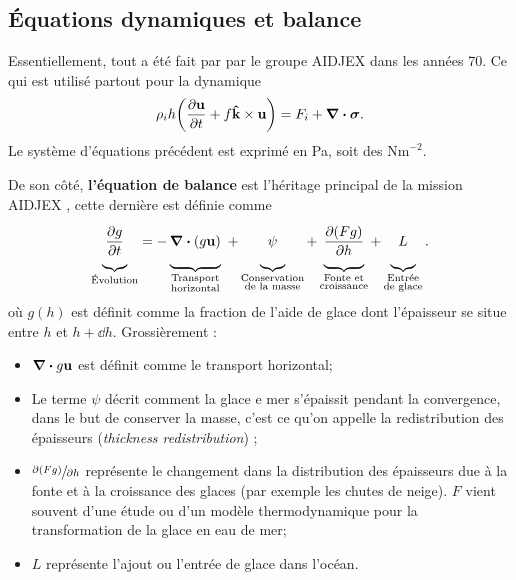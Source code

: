 \documentclass[10pt]{article}
\numberwithin{equation}{section}
\newcommand{\kvf}{\vb{\hat{k}}}
\newcommand{\uu}{\vb{u}}
\newcommand{\venti}{\vphantom{\sum_x^x}}
\begin{document}
\subsection{Équations dynamiques et balance}
\label{sec:orgd4903ac}
Essentiellement, tout a été fait par \Textcite{coon1974modeling} par le groupe AIDJEX dans les années 70.
Ce qui est utilisé partout pour la dynamique
\begin{equation}
   \rho_i h \qty(\pdv{\uu}{t} + f\kvf\times\uu) = F_i + \divergence{\boldsymbol{\sigma}}.
\end{equation}
Le système d'équations précédent est exprimé en Pa, soit des \(\text{Nm}^{-2}\).

De son côté, \textbf{l'équation de balance} est l'héritage principal de la mission AIDJEX \autocite{coon1974modeling,thorndike1975thickness}, cette dernière est définie comme
\begin{equation}
\label{eq:orgc3ece88}
   \underbrace{\venti\pdv{g}{t}}_{\text{Évolution}} =
   -\underbrace{\venti\divergence{(g\uu)}}_{\substack{\text{Transport}\\\text{horizontal}}}\
   +\underbrace{\venti\psi}_{\substack{\text{Conservation}\\\text{de la masse}}}
   +\underbrace{\venti\pdv{(Fg)}{h}}_{\substack{\text{Fonte et}\\\text{croissance}}}
   +\underbrace{\venti L }_{\substack{\text{Entrée}\\\text{de glace}}}.
\end{equation}
où \(g(h)\) est définit comme la fraction de l'aide de glace dont l'épaisseur se situe entre \(h\) et \(h+\dd h\).
Grossièrement :
\begin{itemize}
\item \(\divergence{g\uu}\) est définit comme le transport horizontal;
\item Le terme \(\psi\) décrit comment la glace e mer s'épaissit pendant la convergence, dans le but de conserver la masse, c'est ce qu'on appelle la redistribution des épaisseurs (\emph{thickness redistribution}) \autocite[Voir][]{thorndike1975thickness};
\item \(\sfrac{\partial(Fg)}{\partial h}\) représente le changement dans la distribution des épaisseurs due à la fonte et à la croissance des glaces (par exemple les chutes de neige).
\(F\) vient souvent d'une étude ou d'un modèle thermodynamique pour la transformation de la glace en eau de mer;
\item \(L\) représente l'ajout ou l'entrée de glace dans l'océan.\bigskip
\end{itemize}
\end{document}
